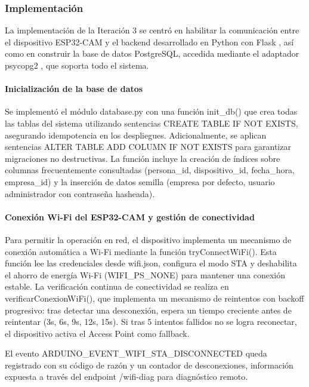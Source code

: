 \subsubsection{Implementación}

La implementación de la Iteración 3 se centró en habilitar la comunicación entre el dispositivo ESP32-CAM y el backend desarrollado en Python con Flask \cite{flask_docs}, así como en construir la base de datos PostgreSQL, accedida mediante el adaptador psycopg2 \cite{psycopg2_docs}, que soporta todo el sistema.

\paragraph{Inicialización de la base de datos}

Se implementó el módulo database.py con una función init\_db() que crea todas las tablas del sistema utilizando sentencias CREATE TABLE IF NOT EXISTS, asegurando idempotencia en los despliegues. Adicionalmente, se aplican sentencias ALTER TABLE ADD COLUMN IF NOT EXISTS para garantizar migraciones no destructivas. La función incluye la creación de índices sobre columnas frecuentemente consultadas (persona\_id, dispositivo\_id, fecha\_hora, empresa\_id) y la inserción de datos semilla (empresa por defecto, usuario administrador con contraseña hasheada).

\paragraph{Conexión Wi-Fi del ESP32-CAM y gestión de conectividad}

Para permitir la operación en red, el dispositivo implementa un mecanismo de conexión automática a Wi-Fi mediante la función tryConnectWiFi(). Esta función lee las credenciales desde wifi.json, configura el modo STA y deshabilita el ahorro de energía Wi-Fi (WIFI\_PS\_NONE) para mantener una conexión estable. La verificación continua de conectividad se realiza en verificarConexionWiFi(), que implementa un mecanismo de reintentos con backoff progresivo: tras detectar una desconexión, espera un tiempo creciente antes de reintentar (3s, 6s, 9s, 12s, 15s). Si tras 5 intentos fallidos no se logra reconectar, el dispositivo activa el Access Point como fallback.

El evento ARDUINO\_EVENT\_WIFI\_STA\_DISCONNECTED queda registrado con su código de razón y un contador de desconexiones, información expuesta a través del endpoint /wifi-diag para diagnóstico remoto.

